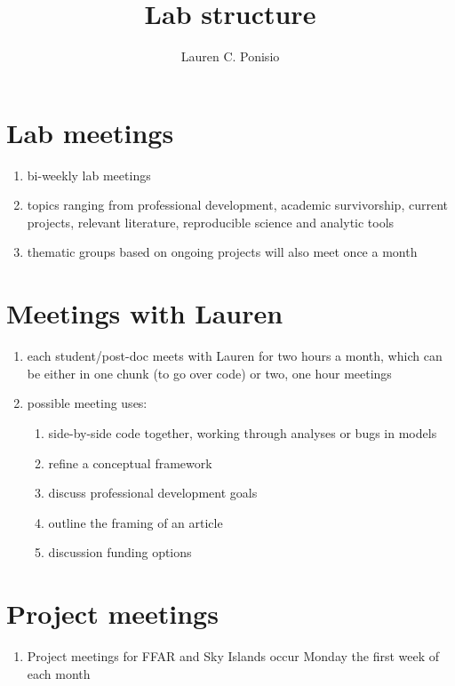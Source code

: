 \documentclass[12pt]{article}
\title{Lab structure}
\author{Lauren C. Ponisio}
\begin{document}
\maketitle

\section{Lab meetings}
\begin{enumerate}
\item bi-weekly lab meetings
\item topics ranging from professional development, academic
  survivorship, current projects, relevant literature, reproducible
  science and analytic tools
\item thematic groups based on ongoing projects will also meet once a
  month
\end{enumerate}

\section{Meetings with Lauren}
\begin{enumerate}
\item each student/post-doc meets with Lauren for two hours a month,
  which can be either in one chunk (to go over code) or two, one hour
  meetings
\item possible meeting uses:
  \begin{enumerate}
  \item side-by-side code together, working through analyses or bugs
    in models
  \item refine a conceptual framework
  \item discuss professional development goals
  \item outline the framing of an article
  \item discussion funding options
  \end{enumerate}
\end{enumerate}

\section{Project meetings}
\begin{enumerate}
\item Project meetings for FFAR and Sky Islands occur Monday the first
  week of each month
\end{enumerate}
\end{document}

